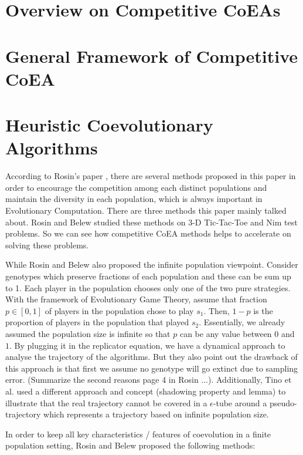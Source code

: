 \documentclass[a4paper,11pt]{report}
\theoremstyle{plain} %
\theoremstyle{definition} %
\theoremstyle{remark} %
\begin{document}
\section{Overview on Competitive CoEAs}

\section{General Framework of Competitive CoEA}

\section{Heuristic Coevolutionary Algorithms}
According to Rosin's paper \citep{rosin_new_1997}, there are several methods proposed in this paper in order to encourage the competition among each distinct populations and maintain the diversity in each population, which is always important in Evolutionary Computation. There are three methods this paper mainly talked about. Rosin and Belew studied these methods on 3-D Tic-Tac-Toe and Nim test problems. So we can see how competitive CoEA methods helps to accelerate on solving these problems.
\par While Rosin and Belew \citep{rosin_new_1997} also proposed the infinite population viewpoint. Consider genotypes which preserve fractions of each population and these can be sum up to 1. Each player in the population chooses only one of the two pure strategies. With the framework of Evolutionary Game Theory, assume that fraction $p\in[0,1]$ of players in the population chose to play $s_{1}$. Then, $1-p$ is the proportion of players in the population that played $s_{2}$. Essentially, we already assumed the population size is infinite so that $p$ can be any value between $0$ and $1$. By plugging it in the replicator equation, we have a dynamical approach to analyse the trajectory of the algorithms. But they also point out the drawback of this approach is that first we assume no genotype will go extinct due to sampling error. (Summarize the second reasons page 4 in Rosin ...). Additionally, Tino et al. \citep{tino_complex_2013} used a different approach and concept (shadowing property and lemma) to illustrate that the real trajectory cannot be covered in a $\epsilon$-tube around a pseudo-trajectory which represents a trajectory based on infinite population size.
\par In order to keep all key characteristics / features of coevolution in a finite population setting, Rosin and Belew proposed the following methods:
\end{document}

